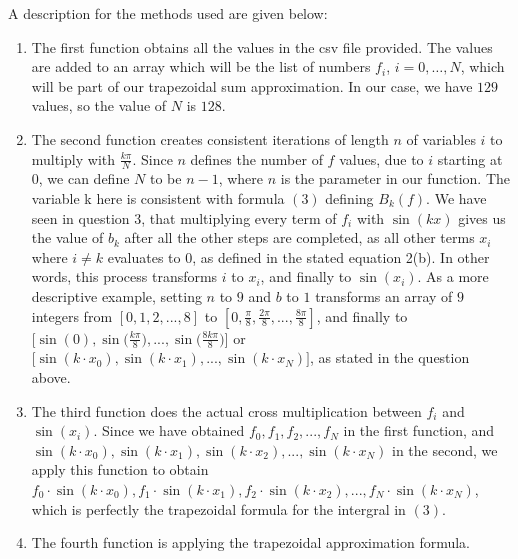 

A description for the methods used are given below:

\begin{enumerate}
  \item The first function obtains all the values in the csv file provided.
        The values are added to an array which will be the list of numbers $f_i$, $i=0,\ldots,N$, which will be part of our trapezoidal sum approximation.
        In our case, we have $129$ values, so the value of $N$ is $128$.
  \item The second function creates consistent iterations of length $n$ of variables $i$ to multiply with $\frac{k\pi}{N}$.
        Since $n$ defines the number of $f$ values, due to $i$ starting at $0$, we can define $N$ to be $n-1$, where $n$ is the parameter in our function.
        The variable k here is consistent with formula $(3)$ defining $B_k(f)$.
        We have seen in question $3$, that multiplying every term of $f_i$ with $\sin(kx)$ gives us the value of $b_k$ after all the other steps are completed,
        as all other terms $x_i$ where $i \neq k$ evaluates to $0$, as defined in the stated equation 2(b).
        In other words, this process transforms $i$ to $x_i$, and finally to $\sin(x_i)$.
        \newline
        As a more descriptive example, setting $n$ to $9$ and $b$ to $1$ transforms an array of $9$ integers
        \vspace{0.05cm}
        \newline
        from $[0, 1, 2, ..., 8]$ to $[0, \frac{\pi}{8}, \frac{2\pi}{8}, ..., \frac{8\pi}{8}]$,
        and finally to $\bigg[\sin(0), \sin\bigg(\frac{k\pi}{8}\bigg), ...,
            \sin\bigg(\frac{8k\pi}{8}\bigg)\bigg]$ or $\bigg[\sin(k \cdot x_0),
            \sin(k \cdot x_1), ..., \sin(k \cdot x_N)\bigg]$, as stated in the question above.
  \item The third function does the actual cross multiplication between $f_i$ and $\sin(x_i)$.
        Since we have obtained $f_0, f_1, f_2, ..., f_N$ in the first function, and $\sin(k \cdot x_0),
          \sin(k \cdot x_1), \sin(k \cdot x_2), ..., \sin(k \cdot x_N)$ in the second,
        we apply this function to obtain $f_0 \cdot \sin(k \cdot x_0), f_1 \cdot \sin(k \cdot x_1),
          f_2 \cdot \sin(k \cdot x_2), ..., f_N \cdot \sin(k \cdot x_N)$, which is perfectly the trapezoidal formula for the intergral in $(3)$.
  \item The fourth function is applying the trapezoidal approximation formula.

\end{enumerate}
